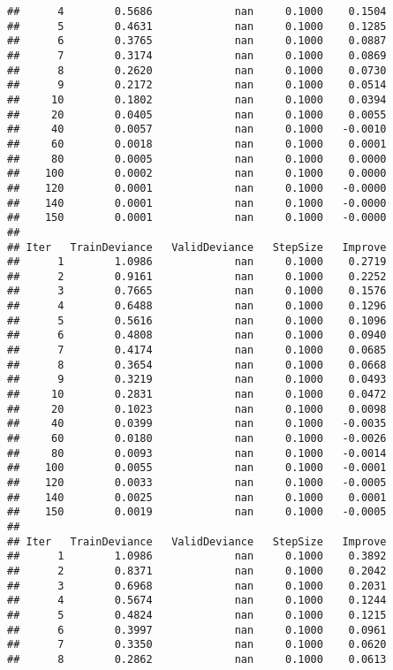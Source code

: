 \documentclass[
]{article}
\begin{document}
\begin{verbatim}
##      4        0.5686             nan     0.1000    0.1504
##      5        0.4631             nan     0.1000    0.1285
##      6        0.3765             nan     0.1000    0.0887
##      7        0.3174             nan     0.1000    0.0869
##      8        0.2620             nan     0.1000    0.0730
##      9        0.2172             nan     0.1000    0.0514
##     10        0.1802             nan     0.1000    0.0394
##     20        0.0405             nan     0.1000    0.0055
##     40        0.0057             nan     0.1000   -0.0010
##     60        0.0018             nan     0.1000    0.0001
##     80        0.0005             nan     0.1000    0.0000
##    100        0.0002             nan     0.1000    0.0000
##    120        0.0001             nan     0.1000   -0.0000
##    140        0.0001             nan     0.1000   -0.0000
##    150        0.0001             nan     0.1000   -0.0000
## 
## Iter   TrainDeviance   ValidDeviance   StepSize   Improve
##      1        1.0986             nan     0.1000    0.2719
##      2        0.9161             nan     0.1000    0.2252
##      3        0.7665             nan     0.1000    0.1576
##      4        0.6488             nan     0.1000    0.1296
##      5        0.5616             nan     0.1000    0.1096
##      6        0.4808             nan     0.1000    0.0940
##      7        0.4174             nan     0.1000    0.0685
##      8        0.3654             nan     0.1000    0.0668
##      9        0.3219             nan     0.1000    0.0493
##     10        0.2831             nan     0.1000    0.0472
##     20        0.1023             nan     0.1000    0.0098
##     40        0.0399             nan     0.1000   -0.0035
##     60        0.0180             nan     0.1000   -0.0026
##     80        0.0093             nan     0.1000   -0.0014
##    100        0.0055             nan     0.1000   -0.0001
##    120        0.0033             nan     0.1000   -0.0005
##    140        0.0025             nan     0.1000    0.0001
##    150        0.0019             nan     0.1000   -0.0005
## 
## Iter   TrainDeviance   ValidDeviance   StepSize   Improve
##      1        1.0986             nan     0.1000    0.3892
##      2        0.8371             nan     0.1000    0.2042
##      3        0.6968             nan     0.1000    0.2031
##      4        0.5674             nan     0.1000    0.1244
##      5        0.4824             nan     0.1000    0.1215
##      6        0.3997             nan     0.1000    0.0961
##      7        0.3350             nan     0.1000    0.0620
##      8        0.2862             nan     0.1000    0.0613

\end{verbatim}
\end{document}

